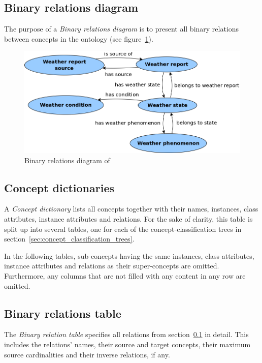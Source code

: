 \subsection{Binary relations diagram}
\label{sec:binary_relations_diagram}

The purpose of a \emph{Binary relations diagram} is to present all binary relations between concepts in the ontology (see figure~\ref{fig:binary_relations}).

\begin{figure}
  \centering
  \includegraphics[width=.8\textwidth]{figures/diagrams/binary-relations.png}
  \caption{Binary relations diagram of \thinkhomeweather}
  \label{fig:binary_relations}
\end{figure}

\subsection{Concept dictionaries}

A \emph{Concept dictionary} lists all concepts together with their names, instances, class attributes, instance attributes and relations. For the sake of clarity, this table is split up into several tables, one for each of the concept-classification trees in section~\ref{sec:concept_classification_trees}.

In the following tables, sub-concepts having the same instances, class attributes, instance attributes and relations as their super-concepts are omitted. Furthermore, any columns that are not filled with any content in any row are omitted.


\subsection{Binary relations table}

The \emph{Binary relation table} specifies all relations from section~\ref{sec:binary_relations_diagram} in detail. This includes the relations' names, their source and target concepts, their maximum source cardinalities and their inverse relations, if any.

